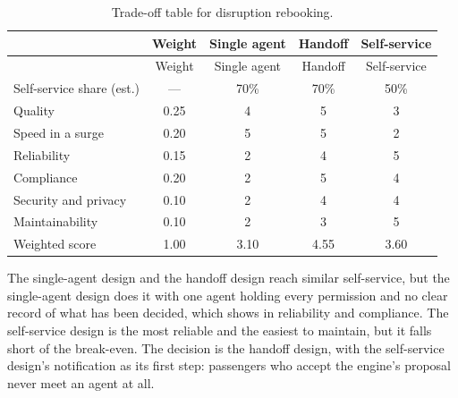 \begingroup
\small
\begin{longtable}{@{}lcccc@{}}
\caption{Trade-off table for disruption rebooking.}\label{tab:air-tradeoff}\\
\toprule
\rowcolor{coHead} & Weight & Single agent & Handoff & Self-service \\
\midrule
\endfirsthead
\toprule
\rowcolor{coHead} & Weight & Single agent & Handoff & Self-service \\
\midrule
\endhead
Self-service share (est.) & --- & 70\% & 70\% & 50\% \\
\midrule
Quality & 0.25 & 4 & 5 & 3 \\
Speed in a surge & 0.20 & 5 & 5 & 2 \\
Reliability & 0.15 & 2 & 4 & 5 \\
Compliance & 0.20 & 2 & 5 & 4 \\
Security and privacy & 0.10 & 2 & 4 & 4 \\
Maintainability & 0.10 & 2 & 3 & 5 \\
\midrule
\rowcolor{coAmberBg} Weighted score & 1.00 & 3.10 & 4.55 & 3.60 \\
\bottomrule
\end{longtable}
\endgroup

The single-agent design and the handoff design reach similar self-service, but the single-agent design does it with one agent holding every permission and no clear record of what has been decided, which shows in reliability and compliance. The self-service design is the most reliable and the easiest to maintain, but it falls short of the break-even. The decision is the handoff design, with the self-service design's notification as its first step: passengers who accept the engine's proposal never meet an agent at all.
